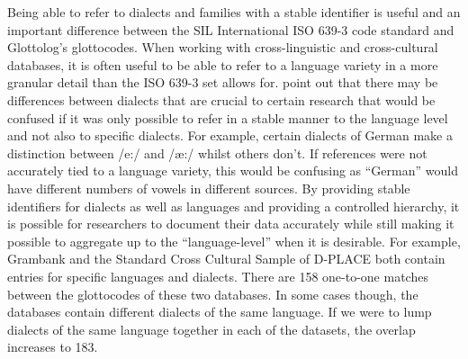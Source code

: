 \documentclass[unnumsec,webpdf,modern,medium]{oup-authoring-template}
\begin{document}
\begin{appendices}

Being able to refer to dialects and families with a stable identifier is useful and an important difference between the SIL International ISO 639-3 code standard and Glottolog's glottocodes. When working with cross-linguistic and cross-cultural databases, it is often useful to be able to refer to a language variety in a more granular detail than the ISO 639-3 set allows for. \citet{nordhoff2011glottolog} point out that there may be differences between dialects that are crucial to certain research that would be confused if it was only possible to refer in a stable manner to the language level and not also to specific dialects. For example, certain dialects of German make a distinction between /e:/ and /æ:/ whilst others don't. If references were not accurately tied to a language variety, this would be confusing as ``German'' would have different numbers of vowels in different sources. By providing stable identifiers for dialects as well as languages and providing a controlled hierarchy, it is possible for researchers to document their data accurately while still making it possible to aggregate up to the ``language-level'' when it is desirable. For example, Grambank and the Standard Cross Cultural Sample of D-PLACE both contain entries for specific languages and dialects. There are 158 one-to-one matches between the glottocodes of these two databases. In some cases though, the databases contain different dialects of the same language. If we were to lump dialects of the same language together in each of the datasets, the overlap increases to 183.


\end{appendices}
\end{document}
